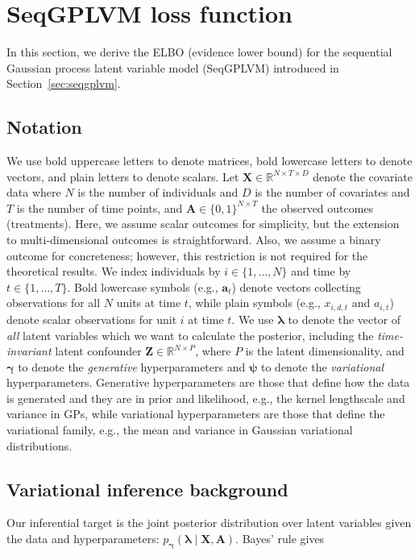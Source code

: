 
\section{SeqGPLVM loss function}
\label{sec:seqgplvm_loss}
In this section, we derive the ELBO (evidence lower bound) for the sequential Gaussian process latent variable 
model (SeqGPLVM) introduced in Section~\ref{sec:seqgplvm}. 

\subsection{Notation}
We use bold uppercase letters to denote matrices, bold lowercase
letters to denote vectors, and plain letters to denote scalars. Let $\mathbf{X} \in \mathbb{R}^{N\times T \times D}$
denote the covariate data 
where \(N\) is the number of individuals and 
\(D\) is the number of covariates and \(T\) is the number of time points, and $\mathbf{A} \in \{0,1\}^{N \times T}$ the observed outcomes (treatments). Here, 
we assume scalar outcomes for simplicity, but the 
extension to multi-dimensional outcomes is straightforward. Also, we assume 
a binary outcome for concreteness; 
however, this restriction is not required 
for the theoretical results. We index individuals 
by \(i \in \{1,\dots,N\}\) and time by \(t \in \{1,\dots,T\}\).
Bold lowercase symbols (e.g., $\mathbf{a}_t$) denote vectors collecting
observations for all $N$ units at time $t$, while plain symbols (e.g., $x_{i,d,t}$
and $a_{i,t}$) denote scalar observations for unit $i$ at time $t$. We use $\boldsymbol{\lambda}$ to denote 
the vector of \textit{all} latent variables which we want to calculate the 
posterior, including the \emph{time-invariant} latent confounder $\mathbf{Z} \in \mathbb{R}^{N \times P}$, where 
\(P\) is the latent dimensionality,
and $\boldsymbol{\gamma}$ to denote the \emph{generative} hyperparameters and $\boldsymbol{\psi}$ 
to denote the \emph{variational} hyperparameters. Generative hyperparameters are those that define 
how the data is generated and they are in prior and likelihood, 
e.g., the kernel lengthscale and variance in GPs, 
while variational hyperparameters are those that define the 
variational family, e.g., the mean and variance in Gaussian 
variational distributions. 

\subsection{Variational inference background}
\label{sec:variational_inference_background}
Our inferential target is the joint posterior distribution over latent variables given the data and hyperparameters:
\(
p_{\boldsymbol{\gamma}}(\boldsymbol{\lambda}\mid \mathbf{X},\mathbf{A})
\). Bayes' rule gives 

